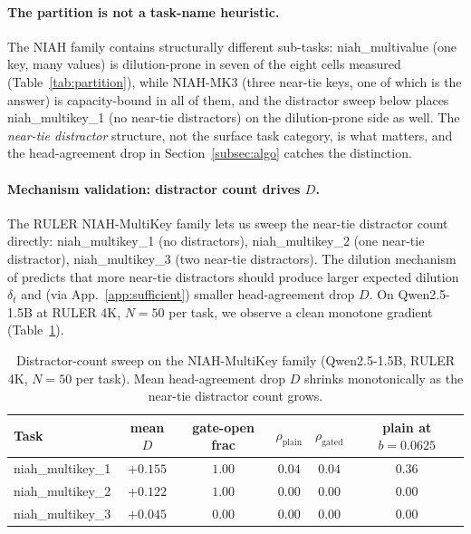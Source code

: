 \documentclass{article} %
\begin{document}
\paragraph{The partition is not a task-name heuristic.} The NIAH family contains
structurally different sub-tasks: niah\_multivalue (one key, many values) is
dilution-prone in seven of the eight cells measured (Table~\ref{tab:partition}), while
NIAH-MK3 (three near-tie keys, one of which is the answer) is capacity-bound in
all of them, and the distractor sweep below places niah\_multikey\_1 (no
near-tie distractors) on the dilution-prone side as well. The
\emph{near-tie distractor} structure, not the surface task category, is what
matters, and the head-agreement drop in Section~\ref{subsec:algo} catches the
distinction.

\paragraph{Mechanism validation: distractor count drives $D$.} The
RULER NIAH-MultiKey family lets us sweep the near-tie distractor count
directly: niah\_multikey\_1 (no distractors), niah\_multikey\_2 (one
near-tie distractor), niah\_multikey\_3 (two near-tie distractors).
The dilution mechanism of \citet{arxiv260509649} predicts that more
near-tie distractors should produce
larger expected dilution $\delta_t$ and (via App.~\ref{app:sufficient})
smaller head-agreement drop $D$. On Qwen2.5-1.5B at RULER 4K, $N = 50$
per task, we observe a clean monotone gradient (Table~\ref{tab:distractor}).

\begin{table}[t]
\centering
\caption{Distractor-count sweep on the NIAH-MultiKey family
(Qwen2.5-1.5B, RULER 4K, $N = 50$ per task). Mean head-agreement drop
$D$ shrinks monotonically as the near-tie distractor count grows.}
\label{tab:distractor}
\begin{tabular}{lccccc}
\toprule
Task & mean $D$ & gate-open frac & $\rho_{\mathrm{plain}}$ & $\rho_{\mathrm{gated}}$ & plain at $b{=}0.0625$ \\
\midrule
niah\_multikey\_1 & $+0.155$ & $1.00$ & $0.04$ & $0.04$ & $0.36$ \\
niah\_multikey\_2 & $+0.122$ & $1.00$ & $0.00$ & $0.00$ & $0.00$ \\
niah\_multikey\_3 & $+0.045$ & $0.00$ & $0.00$ & $0.00$ & $0.00$ \\
\bottomrule
\end{tabular}
\end{table}
\end{document}
